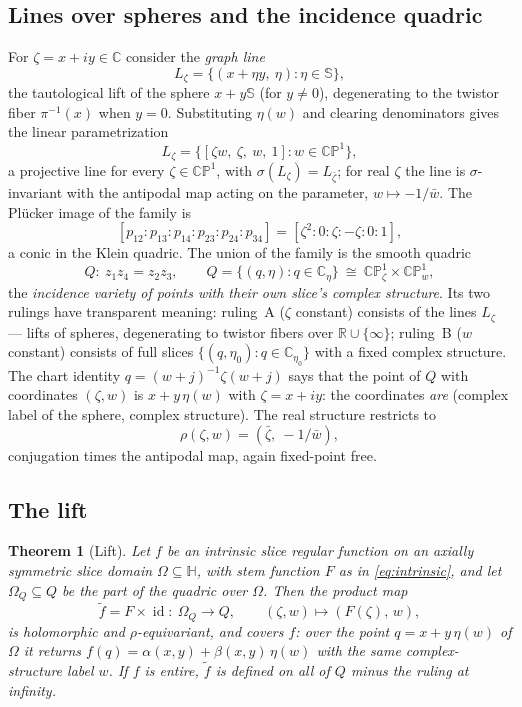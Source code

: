 \documentclass[11pt]{amsart}
\theoremstyle{plain}
\newtheorem{mainthm}{Theorem}
\theoremstyle{definition}
\theoremstyle{remark}
\newcommand{\HH}{\mathbb{H}}
\newcommand{\CC}{\mathbb{C}}
\newcommand{\RR}{\mathbb{R}}
\newcommand{\CP}{\mathbb{CP}}
\renewcommand{\SS}{\mathbb{S}}
\newcommand{\id}{\operatorname{id}}
\begin{document}
\subsection{Lines over spheres and the incidence quadric}

For $\zeta=x+iy\in\CC$ consider the \emph{graph line}
\[
L_\zeta=\{(x+\eta y,\ \eta):\eta\in\SS\},
\]
the tautological lift of the sphere $x+y\SS$ (for $y\neq0$), degenerating to the twistor fiber
$\pi^{-1}(x)$ when $y=0$. Substituting $\eta(w)$ and clearing denominators gives the linear
parametrization
\begin{equation}\label{eq:line}
L_\zeta=\bigl\{[\zeta w,\ \zeta,\ w,\ 1]: w\in\CP^1\bigr\},
\end{equation}
a projective line for every $\zeta\in\CP^1$, with $\sigma(L_\zeta)=L_{\bar\zeta}$; for real $\zeta$
the line is $\sigma$-invariant with the antipodal map acting on the parameter,
$w\mapsto-1/\bar w$. The Pl\"ucker image of the family is
\[
[p_{12}:p_{13}:p_{14}:p_{23}:p_{24}:p_{34}]=[\zeta^2:0:\zeta:-\zeta:0:1],
\]
a conic in the Klein quadric. The union of the family is the smooth quadric
\begin{equation}\label{eq:quadric}
Q:\ z_1z_4=z_2z_3,\qquad
Q=\{(q,\eta):q\in\CC_\eta\}\ \cong\ \CP^1_\zeta\times\CP^1_w ,
\end{equation}
the \emph{incidence variety of points with their own slice's complex structure}. Its two rulings
have transparent meaning: ruling~A ($\zeta$ constant) consists of the lines $L_\zeta$ --- lifts of
spheres, degenerating to twistor fibers over $\RR\cup\{\infty\}$; ruling~B ($w$ constant) consists
of full slices $\{(q,\eta_0):q\in\CC_{\eta_0}\}$ with a fixed complex structure. The chart identity
$q=(w+j)^{-1}\zeta(w+j)$ says that the point of $Q$ with coordinates $(\zeta,w)$ is $x+y\,\eta(w)$
with $\zeta=x+iy$: the coordinates \emph{are} (complex label of the sphere, complex structure). The
real structure restricts to
\begin{equation}\label{eq:rho}
\rho(\zeta,w)=(\bar\zeta,\ -1/\bar w),
\end{equation}
conjugation times the antipodal map, again fixed-point free.

\subsection{The lift}

\begin{mainthm}[Lift]\label{thm:lift}
Let $f$ be an intrinsic slice regular function on an axially symmetric slice domain
$\Omega\subseteq\HH$, with stem function $F$ as in \eqref{eq:intrinsic}, and let
$\Omega_Q\subseteq Q$ be the part of the quadric over $\Omega$. Then the product map
\[
\tilde f=F\times\id\colon\ \Omega_Q\longrightarrow Q,\qquad
(\zeta,w)\longmapsto(F(\zeta),\,w),
\]
is holomorphic and $\rho$-equivariant, and covers $f$: over the point $q=x+y\,\eta(w)$ of
$\Omega$ it returns $f(q)=\alpha(x,y)+\beta(x,y)\,\eta(w)$ with the same complex-structure label
$w$. If $f$ is entire, $\tilde f$ is defined on all of $Q$ minus the ruling at infinity.
\end{mainthm}
\end{document}
